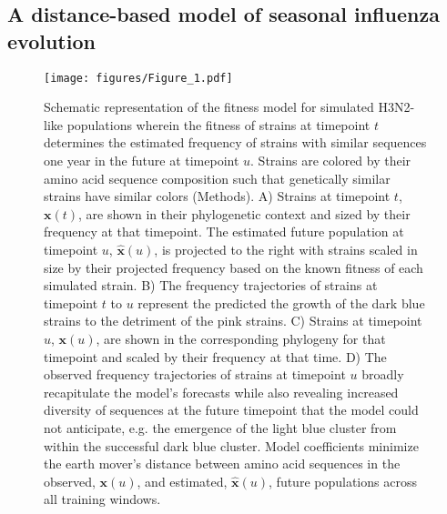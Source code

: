 \subsection*{A distance-based model of seasonal influenza evolution}

\begin{figure}[htb]
  \begin{center}
  \texttt{[image: figures/Figure\_1.pdf]}
  \caption{
    Schematic representation of the fitness model for simulated H3N2-like populations wherein the fitness of strains at timepoint $t$ determines the estimated frequency of strains with similar sequences one year in the future at timepoint $u$.
    Strains are colored by their amino acid sequence composition such that genetically similar strains have similar colors (Methods).
    A) Strains at timepoint $t$, $\mathbf{x}(t)$, are shown in their phylogenetic context and sized by their frequency at that timepoint.
    The estimated future population at timepoint $u$, $\mathbf{\hat{x}}(u)$, is projected to the right with strains scaled in size by their projected frequency based on the known fitness of each simulated strain.
    B) The frequency trajectories of strains at timepoint $t$ to $u$ represent the predicted the growth of the dark blue strains to the detriment of the pink strains.
    C) Strains at timepoint $u$, $\mathbf{x}(u)$, are shown in the corresponding phylogeny for that timepoint and scaled by their frequency at that time.
    D) The observed frequency trajectories of strains at timepoint $u$ broadly recapitulate the model's forecasts while also revealing increased diversity of sequences at the future timepoint that the model could not anticipate, e.g. the emergence of the light blue cluster from within the successful dark blue cluster.
    Model coefficients minimize the earth mover's distance between amino acid sequences in the observed, $\mathbf{x}(u)$,  and estimated, $\mathbf{\hat{x}}(u)$, future populations across all training windows.
  }
  \label{fig:model}
  \end{center}
\end{figure}

